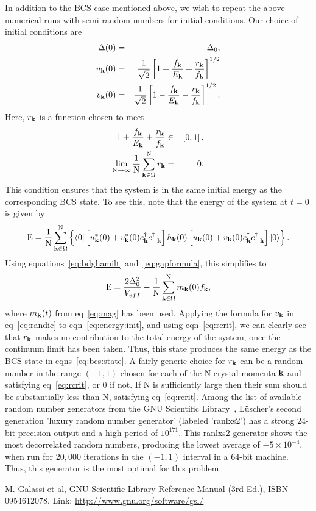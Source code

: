 \documentclass[a4paper,10pt]{article}
\begin{document}
In addition to the BCS case mentioned above, we wish to repeat the above numerical runs with semi-random numbers for initial conditions. Our choice of initial conditions are
\begin{eqnarray}
\label{eq:randic}
\Delta(0) &=& \Delta_0, \nonumber \\
u_{\bf k}(0) &=& \frac{1}{\sqrt{2}} \left[1+\frac{f_{\bf k}}{E_{\bf k}} + \frac{r_{\bf k}}{f_{\bf k}} \right]^{1/2} \nonumber \\
v_{\bf k}(0) &=& \frac{1}{\sqrt{2}} \left[1-\frac{f_{\bf k}}{E_{\bf k}} - \frac{r_{\bf k}}{f_{\bf k}} \right]^{1/2}.
\end{eqnarray}
Here, $r_{\bf k}$ is a function chosen to meet
\begin{eqnarray}
\label{eq:rcrit}
1\pm\frac{f_{\bf k}}{E_{\bf k}} \pm \frac{r_{\bf k}}{f_{\bf k}} &\in& \left[0,1 \right], \nonumber \\
\lim_{\mathrm{N}\rightarrow\infty}\frac{1}{\mathrm N}\sum^{\mathrm N}_{{\bf k}\in\Omega} r_{\bf k} &=& 0.
\end{eqnarray}
This condition ensures that the system is in the same initial energy as the corresponding BCS state. To see this, note that the energy of the system at $t=0$ is given by
\begin{equation}
 {\mathrm E} = \frac{1}{\mathrm N}\sum^{\mathrm N}_{{\bf k}\in\Omega} \left\{\langle 0 | \left[ u^\ast_{\bf k}(0) + v^\ast_{\bf k}(0) c^\dagger_{\bf k}c^\dagger_{-\bf k}\right]  h_{\bf k}(0)\left[ u_{\bf k}(0) + v_{\bf k}(0) c^\dagger_{\bf k}c^\dagger_{-\bf k}\right] |0\rangle\right\}.
\end{equation}
Using equations~\ref{eq:bdghamilt} and~\ref{eq:gapformula}, this simplifies to
\begin{equation}
\label{eq:energy:init}
{\mathrm E} = \frac{2\Delta^2_0}{V_{eff}}-\frac{1}{\mathrm N}\sum^{\mathrm N}_{{\bf k}\in\Omega}m_{\bf k}(0)f_{\bf k},
\end{equation}
where $m_{\bf k}(t)$ from eq~\ref{eq:mag} has been used. Applying the formula for $v_{\bf k}$ in eq~\ref{eq:randic} to eqn~\ref{eq:energy:init}, and using eqn~\ref{eq:rcrit}, we can clearly see that $r_{\bf k}$ makes no contribution to the total energy of the system, once the continuum limit has been taken.
Thus, this state produces the same energy as the BCS state in eqns~\ref{eq:bcs:state}. A fairly generic choice for $r_{\bf k}$ can be 
a random number in the range $(-1,1)$ chosen for each of the $\mathrm{N}$ crystal momenta ${\bf k}$ and satisfying eq~\ref{eq:rcrit}, or $0$ if not. If $\mathrm{N}$ is sufficiently large then their sum should be substantially less than $\mathrm{N}$, satisfying eq~\ref{eq:rcrit}. Among the list of available random number generators from the GNU Scientific Library~\cite{gsl:manual}, L\"uscher's second generation 'luxury random number generator' (labeled 'ranlxs2') has a strong $24$-bit precision output and a high period of $10^{171}$. This ranlxs2 generator shows the most decorrelated random numbers, producing the lowest average of $-5\times 10^{-4}$, when run for $20,000$ iterations in the $(-1,1)$ interval in a $64$-bit machine. Thus, this generator is the most optimal for this problem.


\begin{thebibliography}{10}
M. Galassi et al, 
GNU Scientific Library Reference Manual (3rd Ed.), 
ISBN 0954612078.
Link: \url{http://www.gnu.org/software/gsl/}
\end{thebibliography}
\end{document}
